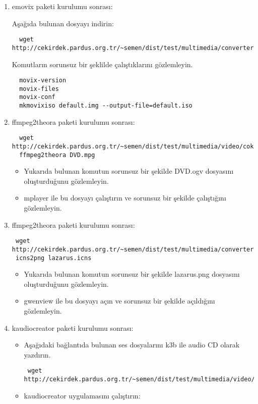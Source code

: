 \documentclass[a4paper,10pt]{article}
\begin{document}
\begin{enumerate}
\begin{itemize}
\end{itemize}
\item emovix paketi kurulumu sonrası:

Aşağıda bulunan dosyayı indirin:
\begin{verbatim}
  wget http://cekirdek.pardus.org.tr/~semen/dist/test/multimedia/converter/default.img
\end{verbatim}
 
Komutların sorunsuz bir şeklilde çalıştıklarını gözlemleyin.
\begin{verbatim}
  movix-version
  movix-files
  movix-conf
  mkmovixiso default.img --output-file=default.iso
\end{verbatim}

\item ffmpeg2theora paketi kurulumu sonrası:
\begin{verbatim}
  wget http://cekirdek.pardus.org.tr/~semen/dist/test/multimedia/video/cokluortam/DVD.mpg
  ffmpeg2theora DVD.mpg
\end{verbatim}
\begin{itemize}
 \item Yukarıda bulunan komutun sorunsuz bir şekilde DVD.ogv dosyasını oluşturduğunu gözlemleyin.
 \item mplayer ile bu dosyayı çalıştırın ve sorunsuz bir şekilde çalıştığını gözlemleyin.
\end{itemize}
\item ffmpeg2theora paketi kurulumu sonrası:
\begin{verbatim}
 wget http://cekirdek.pardus.org.tr/~semen/dist/test/multimedia/converter/lazarus.png
 icns2png lazarus.icns
\end{verbatim}
\begin{itemize}
 \item Yukarıda bulunan komutun sorunsuz bir şekilde lazarus.png dosyasını oluşturduğunu gözlemleyin.
 \item gwenview ile bu dosyayı açın ve sorunsuz bir şekilde açıldığını gözlemleyin.
\end{itemize}
\item kaudiocreator paketi kurulumu sonrası:
\begin{itemize}
 \item Aşağıdaki bağlantıda bulunan ses dosyalarını k3b ile audio CD olarak yazdırın.
\begin{verbatim}
 wget http://cekirdek.pardus.org.tr/~semen/dist/test/multimedia/video/cokluortam/
\end{verbatim}
 \item kaudiocreator uygulamasını çalıştırın:


\end{itemize}
\end{enumerate}
\end{document}
